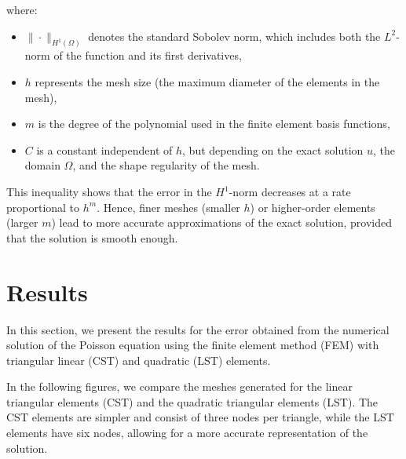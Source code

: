 \documentclass[12pt]{article}
\begin{document}
where:
\begin{itemize}
    \item \( \| \cdot \|_{H^1(\Omega)} \) denotes the standard Sobolev norm, which includes both the \( L^2 \)-norm of the function and its first derivatives,
    \item \( h \) represents the mesh size (the maximum diameter of the elements in the mesh),
    \item \( m \) is the degree of the polynomial used in the finite element basis functions,
    \item \( C \) is a constant independent of \( h \), but depending on the exact solution \( u \), the domain \( \Omega \), and the shape regularity of the mesh.
\end{itemize}

This inequality shows that the error in the \( H^1 \)-norm decreases at a rate proportional to \( h^m \). Hence, finer meshes (smaller \( h \)) or higher-order elements (larger \( m \)) lead to more accurate approximations of the exact solution, provided that the solution is smooth enough.


\newpage
\section{Results}

In this section, we present the results for the error obtained from the numerical solution of the Poisson equation using the finite element method (FEM) with triangular linear (CST) and quadratic (LST) elements.


In the following figures, we compare the meshes generated for the linear triangular elements (CST) and the quadratic triangular elements (LST). The CST elements are simpler and consist of three nodes per triangle, while the LST elements have six nodes, allowing for a more accurate representation of the solution.
\end{document}
